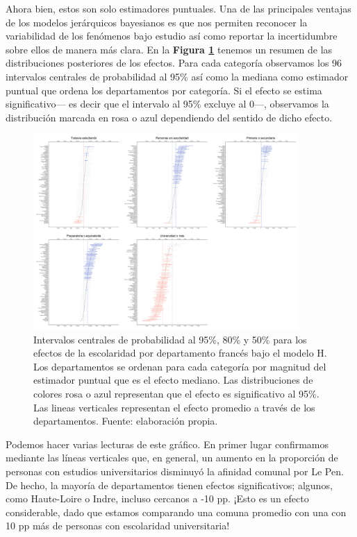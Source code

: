 Ahora bien, estos son solo estimadores puntuales. Una de las principales ventajas de los modelos jerárquicos bayesianos es que nos permiten reconocer la variabilidad de los fenómenos bajo estudio así como reportar la incertidumbre sobre ellos de manera más clara. En la \textbf{Figura \ref{fig:Efectos_Escolaridad}} tenemos un resumen de las distribuciones posteriores de los efectos. Para cada categoría observamos los 96 intervalos centrales de probabilidad al 95\% así como la mediana como estimador puntual que ordena los departamentos por categoría. Si el efecto se estima significativo--- es decir que el intervalo al 95\% excluye al 0---, observamos la distribución marcada en rosa o azul dependiendo del sentido de dicho efecto.\\

\begin{figure}[h]
	\centering
	\includegraphics[width = 0.9\textwidth]{Figs/Efectos/Efectos_Escolaridad_Modelo_H}
	\caption{Intervalos centrales de probabilidad al 95\%, 80\% y 50\% para los efectos de la escolaridad por departamento francés bajo el modelo H. Los departamentos se ordenan para cada categoría por magnitud del estimador puntual que es el efecto mediano. Las distribuciones de colores rosa o azul representan que el efecto es significativo al 95\%. Las lineas verticales representan el efecto promedio a través de los departamentos. Fuente: elaboración propia.}
	\label{fig:Efectos_Escolaridad}
\end{figure}

Podemos hacer varias lecturas de este gráfico. En primer lugar confirmamos mediante las líneas verticales que, en general, un aumento en la proporción de personas con estudios universitarios disminuyó la afinidad comunal por Le Pen. De hecho, la mayoría de departamentos tienen efectos significativos; algunos, como Haute-Loire o Indre, incluso cercanos a -10 pp. ¡Esto es un efecto considerable, dado que estamos comparando una comuna promedio con una con 10 pp más de personas con escolaridad universitaria!\\

